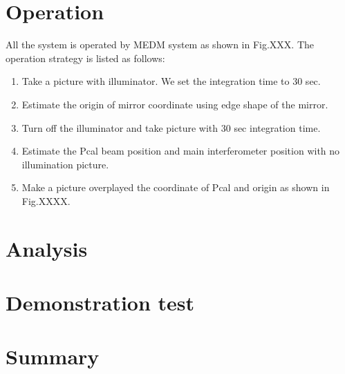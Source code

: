 \section{Operation}
All the system is operated by MEDM system as shown in Fig.XXX.
The operation strategy is listed as follows:
\begin{enumerate}
 \item Take a picture with illuminator. We set the integration time to 30 sec.
 \item Estimate the origin of mirror coordinate using edge shape of the mirror.
 \item Turn off the illuminator and take picture with 30 sec integration time.
  \item Estimate the Pcal beam position and main interferometer position with no illumination picture.
   \item Make a picture overplayed the coordinate of Pcal and origin as shown in Fig.XXXX.
\end{enumerate}
\section{Analysis}
\section{Demonstration test}
\section{Summary}

 